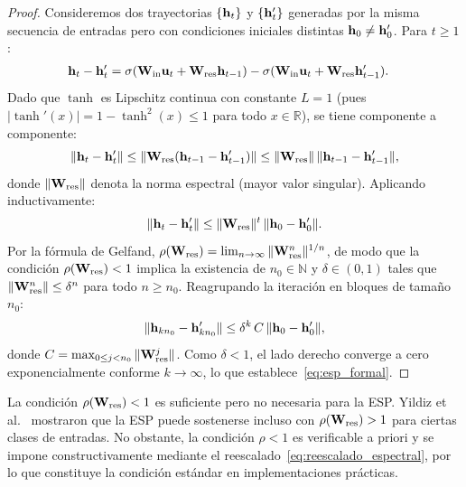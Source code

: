\begin{proof}
Consideremos dos trayectorias $\{\mathbf{h}_t\}$ y
$\{\mathbf{h}_t'\}$ generadas por la misma secuencia de entradas
pero con condiciones iniciales distintas $\mathbf{h}_0 \ne
\mathbf{h}_0'$.  Para $t \ge 1$:
\begin{align}
    \mathbf{h}_t - \mathbf{h}_t' &=
    \sigma(\mathbf{W}_{\text{in}}\mathbf{u}_t +
    \mathbf{W}_{\text{res}}\mathbf{h}_{t-1}) -
    \sigma(\mathbf{W}_{\text{in}}\mathbf{u}_t +
    \mathbf{W}_{\text{res}}\mathbf{h}_{t-1}').
    \label{eq:diferencia_trayectorias}
\end{align}
Dado que $\tanh$ es Lipschitz continua con constante $L = 1$
(pues $|\tanh'(x)| = 1 - \tanh^2(x) \le 1$ para todo
$x \in \mathbb{R}$), se tiene componente a componente:
\begin{equation}
    \|\mathbf{h}_t - \mathbf{h}_t'\| \le
    \|\mathbf{W}_{\text{res}}(\mathbf{h}_{t-1} - \mathbf{h}_{t-1}')\|
    \le \|\mathbf{W}_{\text{res}}\|\,
    \|\mathbf{h}_{t-1} - \mathbf{h}_{t-1}'\|,
    \label{eq:contraccion_paso}
\end{equation}
donde $\|\mathbf{W}_{\text{res}}\|$ denota la norma espectral
(mayor valor singular).  Aplicando inductivamente:
\begin{equation}
    \|\mathbf{h}_t - \mathbf{h}_t'\| \le
    \|\mathbf{W}_{\text{res}}\|^t\,
    \|\mathbf{h}_0 - \mathbf{h}_0'\|.
    \label{eq:contraccion_inductiva}
\end{equation}
Por la fórmula de Gelfand, $\rho(\mathbf{W}_{\text{res}}) =
\lim_{n \to \infty} \|\mathbf{W}_{\text{res}}^n\|^{1/n}$, de modo
que la condición $\rho(\mathbf{W}_{\text{res}}) < 1$ implica la
existencia de $n_0 \in \mathbb{N}$ y $\delta \in (0,1)$ tales que
$\|\mathbf{W}_{\text{res}}^n\| \le \delta^n$ para todo $n \ge n_0$.
Reagrupando la iteración en bloques de tamaño $n_0$:
\begin{equation}
    \|\mathbf{h}_{kn_0} - \mathbf{h}_{kn_0}'\| \le
    \delta^k\, C\, \|\mathbf{h}_0 - \mathbf{h}_0'\|,
    \label{eq:contraccion_gelfand}
\end{equation}
donde $C = \max_{0 \le j < n_0} \|\mathbf{W}_{\text{res}}^j\|$.
Como $\delta < 1$, el lado derecho converge a cero
exponencialmente conforme $k \to \infty$, lo que
establece~\eqref{eq:esp_formal}.
\end{proof}

\begin{remark}
\label{obs:rho_condicion}
La condición $\rho(\mathbf{W}_{\text{res}}) < 1$ es suficiente
pero no necesaria para la ESP.  Yildiz et al.\ \cite{yildiz2012}
mostraron que la ESP puede sostenerse incluso con
$\rho(\mathbf{W}_{\text{res}}) > 1$ para ciertas clases de entradas.
No obstante, la condición $\rho < 1$ es verificable a priori y
se impone constructivamente mediante el
reescalado~\eqref{eq:reescalado_espectral}, por lo que constituye
la condición estándar en implementaciones prácticas.
\end{remark}

